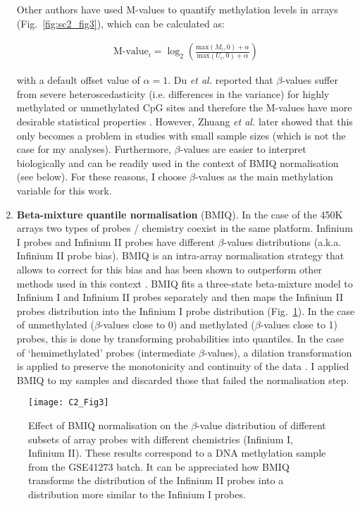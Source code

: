 \begin{enumerate}
	Other authors have used M-values to quantify methylation levels in arrays (Fig.~\ref{fig:sc2_fig3}), which can be calculated as:
	
	\begin{align}
	\text{M-value}_i = \log_2 \left(\frac{\text{max}(M_i,0) + \alpha}{\text{max}(U_i,0) + \alpha}\right)
	\end{align}
	
	with a default offset value of $\alpha=1$.  Du \textit{et al.} reported that $\beta$-values suffer from severe heteroscedasticity (i.e. differences in the variance) for highly methylated or unmethylated CpG sites and therefore the M-values have more desirable statistical properties \citep{Du2010}. However, Zhuang \textit{et al.} later showed that this only becomes a problem in studies with small sample sizes \citep{Zhuang2012} (which is not the case for my analyses). Furthermore, $\beta$-values are easier to interpret biologically and can be readily used in the context of BMIQ normalisation (see below). For these reasons, I choose $\beta$-values as the main methylation variable for this work.
	
	\item \textbf{Beta-mixture quantile normalisation} (\acrshort{BMIQ}). In the case of the 450K arrays two types of probes / chemistry coexist in the same platform. Infinium I probes and Infinium II probes have different $\beta$-values distributions (a.k.a. Infinium II probe bias). BMIQ is an intra-array normalisation strategy that allows to correct for this bias and has been shown to outperform other methods used in this context \citep{Teschendorff2012,Dedeurwaerder2011,Touleimat2012,Maksimovic2012}. BMIQ fits a three-state beta-mixture model to Infinium I and Infinium II probes separately and then maps the Infinium II probes distribution into the Infinium I probe distribution (Fig.~\ref{fig:c2_fig3}). In the case of unmethylated ($\beta$-values close to 0) and methylated ($\beta$-values close to 1) probes, this is done by transforming probabilities into quantiles. In the case of `hemimethylated' probes (intermediate $\beta$-values), a dilation transformation is applied to preserve the monotonicity and continuity of the data \citep{Teschendorff2012}. I applied BMIQ to my samples and discarded those that failed the normalisation step.  
	
\end{enumerate}

 
\begin{figure}[htbp!] 
	\centering    
	\texttt{[image: C2\_Fig3]}
	\caption[Effect of BMIQ normalisation on the $\beta$-value distribution]{Effect of BMIQ normalisation on the $\beta$-value distribution of different subsets of array probes with different chemistries (Infinium I, Infinium II). These results correspond to a DNA methylation sample from the GSE41273 batch. It can be appreciated how BMIQ transforms the distribution of the Infinium II probes into a distribution more similar to the Infinium I probes.}
	\label{fig:c2_fig3}
\end{figure}

